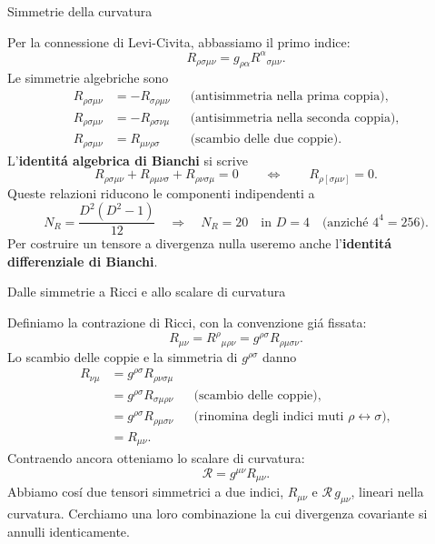 % 

\begin{frame}[t]{Simmetrie della curvatura}
\small\raggedright
Per la connessione di Levi-Civita, abbassiamo il primo indice:
\[
R_{\rho\sigma\mu\nu}
=g_{\rho\alpha}R^\alpha{}_{\sigma\mu\nu}.
\]
Le simmetrie algebriche sono
\[
\begin{aligned}
R_{\rho\sigma\mu\nu}&=-R_{\sigma\rho\mu\nu}
&&\text{(antisimmetria nella prima coppia)},\\
R_{\rho\sigma\mu\nu}&=-R_{\rho\sigma\nu\mu}
&&\text{(antisimmetria nella seconda coppia)},\\
R_{\rho\sigma\mu\nu}&=R_{\mu\nu\rho\sigma}
&&\text{(scambio delle due coppie)}.
\end{aligned}
\]
L'\textbf{identit\'a algebrica di Bianchi} si scrive
\[
\boxed{
R_{\rho\sigma\mu\nu}
+R_{\rho\mu\nu\sigma}
+R_{\rho\nu\sigma\mu}=0
}
\qquad\Longleftrightarrow\qquad
R_{\rho[\sigma\mu\nu]}=0.
\]
Queste relazioni riducono le componenti indipendenti a
\[
N_R=\frac{D^2(D^2-1)}{12}
\quad\Longrightarrow\quad
N_R=20\quad\text{in }D=4\quad\text{(anzich\'e }4^4=256\text{)}.
\]
Per costruire un tensore a divergenza nulla useremo anche
l'\textbf{identit\'a differenziale di Bianchi}.
\end{frame}

\begin{frame}[t]{Dalle simmetrie a Ricci e allo scalare di curvatura}
\small\raggedright
Definiamo la contrazione di Ricci, con la convenzione gi\'a fissata:
\[
\boxed{
R_{\mu\nu}=R^\rho{}_{\mu\rho\nu}
=g^{\rho\sigma}R_{\rho\mu\sigma\nu}.
}
\]
Lo scambio delle coppie e la simmetria di $g^{\rho\sigma}$ danno
\[
\begin{aligned}
R_{\nu\mu}
&=g^{\rho\sigma}R_{\rho\nu\sigma\mu}\\
&=g^{\rho\sigma}R_{\sigma\mu\rho\nu}
&&\text{(scambio delle coppie)},\\
&=g^{\rho\sigma}R_{\rho\mu\sigma\nu}
&&\text{(rinomina degli indici muti $\rho\leftrightarrow\sigma$)},\\
&=R_{\mu\nu}.
\end{aligned}
\]
Contraendo ancora otteniamo lo scalare di curvatura:
\[
\boxed{\mathcal R=g^{\mu\nu}R_{\mu\nu}.}
\]
Abbiamo cos\'i due tensori simmetrici a due indici,
$R_{\mu\nu}$ e $\mathcal R\,g_{\mu\nu}$,
lineari nella curvatura. Cerchiamo una loro combinazione
la cui divergenza covariante si annulli identicamente.
\end{frame}

